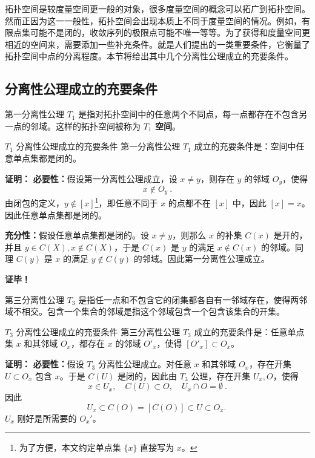 
\cite{Ke1}拓扑空间是较度量空间更一般的对象，很多度量空间的概念可以拓广到拓扑空间。然而正因为这一一般性，拓扑空间会出现本质上不同于度量空间的情况。例如，有限点集可能不是闭的，收敛序列的极限点可能不唯一等等。为了获得和度量空间更相近的空间来，需要添加一些补充条件。就是人们提出的一类重要条件，它衡量了拓扑空间中点的分离程度。本节将给出其中几个分离性公理成立的充要条件。

\subsection{分离性公理成立的充要条件}
第一分离性公理 $T_1$ 是指对拓扑空间中的任意两个不同点，每一点都存在不包含另一点的邻域。这样的拓扑空间被称为\textbf{ $T_1$ 空间}。
\begin{theorem}{$T_1$ 分离性公理成立的充要条件}\label{the_DisAx_1}
第一分离性公理 $T_1$ 成立的充要条件是：空间中任意单点集都是闭的。
\end{theorem}
\textbf{证明：}
\textbf{必要性：}假设第一分离性公理成立，设 $x\neq y$，则存在 $y$ 的邻域 $O_y$，使得
\begin{equation}
x\notin O_y~.
\end{equation}
由闭包的定义，$y\notin [x]$\footnote{为了方便，本文约定单点集 $\{x\}$ 直接写为 $x$。}，即任意不同于 $x$ 的点都不在 $[x]$ 中，因此 $[x]=x$。因此任意单点集都是闭的。

\textbf{充分性：}假设任意单点集都是闭的。设 $x\neq y$，则那么 $x$ 的补集 $C(x)$ 是开的，并且 $y\in C(X),x\notin C(X)$，于是 $C(x)$ 是 $y$ 的满足 $x\notin C(x)$ 的邻域。同理 $C(y)$ 是 $x$ 的满足 $y\notin C(y)$ 的邻域。因此第一分离性公理成立。

\textbf{证毕！}



第三分离性公理 $T_3$ 是指任一点和不包含它的闭集都各自有一邻域存在，使得两邻域不相交。包含一个集合的邻域是指这个邻域包含一个包含该集合的开集。


\begin{theorem}{$T_3$ 分离性公理成立的充要条件}
第三分离性公理 $T_3$ 成立的充要条件是：任意单点集 $x$ 和其邻域 $O_x$，都存在 $x$ 的邻域 $ O'_x$，使得 $[O'_x]\subset O_x$。
\end{theorem}

\textbf{证明：}
\textbf{必要性：}假设 $T_3$ 分离性公理成立。对任意 $x$ 和其邻域 $O_x$，存在开集 $U\subset O_x$ 包含 $x$。于是 $C(U)$ 是闭的，因此由 $T_3$ 公理，存在开集 $U_x, O$，使得
\begin{equation}
x\in U_x,\quad C(U)\subset O,\quad U_x\cap O=\emptyset~.
\end{equation}
因此
\begin{equation}
U_x\subset C(O)=[C(O)]\subset U\subset O_x.~
\end{equation}
$U_x$ 刚好是所需要的 $O_x'$。

